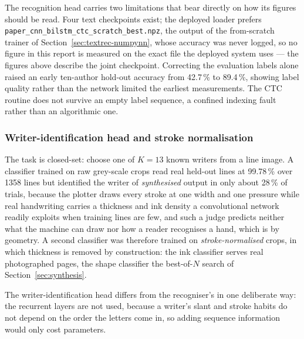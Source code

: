 \label{sec:rec-ctc-limits}
The recognition head carries two limitations that bear directly on how its figures should be read. Four text checkpoints exist; the deployed loader prefers \texttt{paper\_cnn\_bilstm\_ctc\_scratch\_best.npz}, the output of the from-scratch trainer of Section~\ref{sec:textrec-numpynn}, whose accuracy was never logged, so no figure in this report is measured on the exact file the deployed system uses --- the figures above describe the joint checkpoint.  Correcting the evaluation labels alone raised an early ten-author hold-out accuracy from 42.7\,\% to 89.4\,\%, showing label quality rather than the network limited the earliest measurements. The CTC routine does not survive an empty label sequence, a confined indexing fault rather than an algorithmic one.

\subsubsection{Writer-identification head and stroke normalisation}
\label{sec:wid-head}
\label{sec:wid-strokenorm}

The task is closed-set: choose one of $K=13$ known writers from a line image. A classifier trained on raw grey-scale crops read real held-out lines at 99.78\,\% over 1358 lines but identified the writer of \emph{synthesised} output in only about 28\,\% of trials, because the plotter draws every stroke at one width and one pressure while real handwriting carries a thickness and ink density a convolutional network readily exploits when training lines are few, and such a judge predicts neither what the machine can draw nor how a reader recognises a hand, which is by geometry. A second classifier was therefore trained on \emph{stroke-normalised} crops, in which thickness is removed by construction: the ink classifier serves real photographed pages, the shape classifier the best-of-$N$ search of Section~\ref{sec:synthesis}.

The writer-identification head differs from the recogniser's in one deliberate way: the recurrent layers are not used, because a writer's slant and stroke habits do not depend on the order the letters come in, so adding sequence information would only cost parameters.


